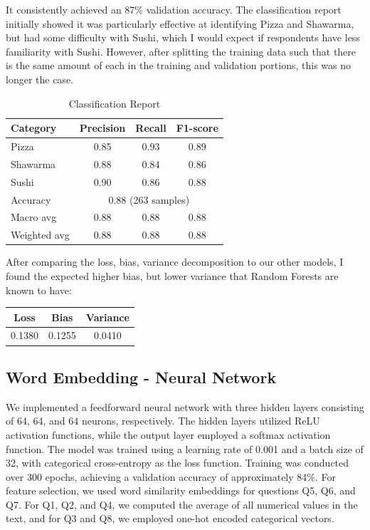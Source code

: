 \begin{itemize}
It consistently achieved an 87\% validation accuracy. The classification report initially showed it was particularly effective at identifying Pizza and Shawarma, but had some difficulty with Sushi, which I would expect if respondents have less familiarity with Sushi. However, after splitting the training data such that there is the same amount of each in the training and validation portions, this was no longer the case.
\begin{table}[ht]
    \centering
    \begin{tabular}{lccc}
        \hline
        Category     & Precision                              & Recall & F1-score \\
        \hline
        Pizza        & 0.85                                   & 0.93   & 0.89     \\
        Shawarma     & 0.88                                   & 0.84   & 0.86     \\
        Sushi        & 0.90                                   & 0.86   & 0.88     \\
        \hline
        Accuracy     & \multicolumn{3}{c}{0.88 (263 samples)}                     \\
        Macro avg    & 0.88                                   & 0.88   & 0.88     \\
        Weighted avg & 0.88                                   & 0.88   & 0.88     \\
        \hline
    \end{tabular}
    \caption{Classification Report}
    \label{tab:classification_report}
\end{table}

After comparing the loss, bias, variance decomposition to our other models, I found the expected higher bias, but lower variance that Random Forests are known to have:
\begin{table}[ht]
    \centering
    \begin{tabular}{ccc}
        \hline
        Loss   & Bias   & Variance \\
        \hline
        0.1380 & 0.1255 & 0.0410   \\
        \hline
    \end{tabular}
    \label{tab:loss_report}
\end{table}

\subsection{Word Embedding - Neural Network}
We implemented a feedforward neural network with three hidden layers consisting of 64, 64, and 64 neurons, respectively. The hidden layers utilized ReLU activation functions, while the output layer employed a softmax activation function. The model was trained using a learning rate of 0.001 and a batch size of 32, with categorical cross-entropy as the loss function. Training was conducted over 300 epochs, achieving a validation accuracy of approximately 84\%. For feature selection, we used word similarity embeddings for questions Q5, Q6, and Q7. For Q1, Q2, and Q4, we computed the average of all numerical values in the text, and for Q3 and Q8, we employed one-hot encoded categorical vectors.


\end{itemize}
